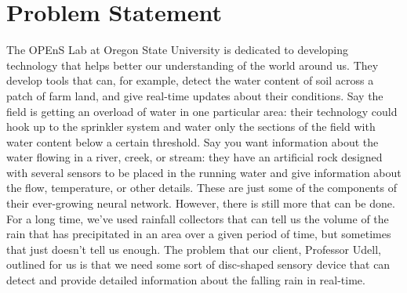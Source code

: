 \documentclass[letterpaper,10pt]{article}
\begin{document}
\section{Problem Statement}
The OPEnS Lab at Oregon State University is dedicated to developing technology that helps better our understanding of the world around us. They develop tools that can, for example, detect the water content of soil across a patch of farm land, and give real-time updates about their conditions. Say the field is getting an overload of water in one particular area: their technology could hook up to the sprinkler system and water only the sections of the field with water content below a certain threshold.
\newline
\newline
Say you want information about the water flowing in a river, creek, or stream: they have an artificial rock designed with several sensors to be placed in the running water and give information about the flow, temperature, or other details. These are just some of the components of their ever-growing neural network. However, there is still more that can be done. For a long time, we've used rainfall collectors that can tell us the volume of the rain that has precipitated in an area over a given period of time, but sometimes that just doesn't tell us enough. The problem that our client, Professor Udell, outlined for us is that we need some sort of disc-shaped sensory device that can detect and provide detailed information about the falling rain in real-time. 
\newline
\end{document}
